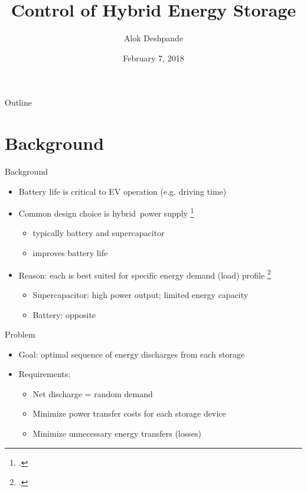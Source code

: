 \documentclass{beamer}
\title{Control of Hybrid Energy Storage}
\author{Alok Deshpande}
\date{February 7, 2018}
\begin{document}
\begin{frame}
\titlepage
\end{frame}

\begin{frame}{Outline}
\tableofcontents
\end{frame}

\section{Background}
\begin{frame}{Background}
\begin{itemize}
\item Battery life is critical to EV operation (e.g. driving time) 
\item Common design choice is hybrid power supply \footcite{thounthong2009energy}
\begin{itemize}
\item typically battery and supercapacitor
\item improves battery life
\end{itemize}
\item Reason: each is best suited for specific energy demand (load) profile \footcite{thounthong2009energy}
\begin{itemize}
\item Supercapacitor: high power output; limited energy capacity
\item Battery: opposite
\end{itemize}
\end{itemize}
\end{frame}
\begin{frame}{Problem}
\begin{itemize}
\item Goal: optimal sequence of energy discharges from each storage
\item Requirements:
\begin{itemize}
\item Net discharge = random demand
\item Minimize power transfer costs for each storage device
\item Minimize unnecessary energy transfers (losses)
\end{itemize}
\end{itemize}
\end{frame}
\end{document}
